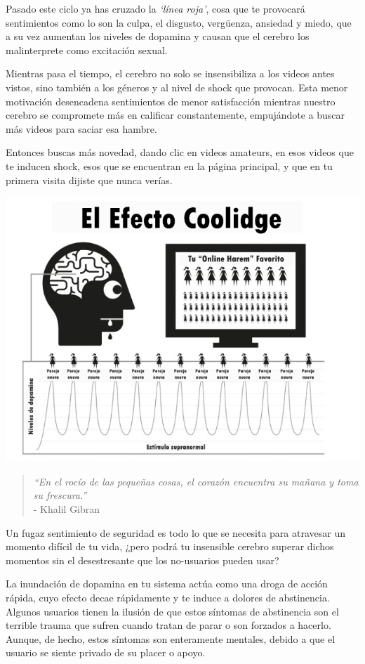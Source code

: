 \documentclass[
  spanish,
  openany]{book}
\begin{document}
Pasado este ciclo ya has cruzado la \emph{`línea roja'}, cosa que te provocará sentimientos como lo son la culpa, el disgusto, vergüenza, ansiedad y miedo, que a su vez aumentan los niveles de dopamina y causan que el cerebro los malinterprete como excitación sexual.

Mientras pasa el tiempo, el cerebro no solo se insensibiliza a los videos antes vistos, sino también a los géneros y al nivel de shock que provocan. Esta menor motivación desencadena sentimientos de menor satisfacción mientras nuestro cerebro se compromete más en calificar constantemente, empujándote a buscar más videos para saciar esa hambre.

Entonces buscas más novedad, dando clic en videos amateurs, en esos videos que te inducen shock, esos que se encuentran en la página principal, y que en tu primera visita dijiste que nunca verías.

\includegraphics{img-el-efecto-coolidge.png}\\

\begin{quote}
\emph{``En el rocío de las pequeñas cosas, el corazón encuentra su mañana y toma su frescura.''}\\
- Khalil Gibran
\end{quote}

Un fugaz sentimiento de seguridad es todo lo que se necesita para atravesar un momento difícil de tu vida, ¿pero podrá tu insensible cerebro superar dichos momentos sin el desestresante que los no-usuarios pueden usar?

La inundación de dopamina en tu sistema actúa como una droga de acción rápida, cuyo efecto decae rápidamente y te induce a dolores de abstinencia. Algunos usuarios tienen la ilusión de que estos síntomas de abstinencia son el terrible trauma que sufren cuando tratan de parar o son forzados a hacerlo. Aunque, de hecho, estos síntomas son enteramente mentales, debido a que el usuario se siente privado de su placer o apoyo.
\end{document}

